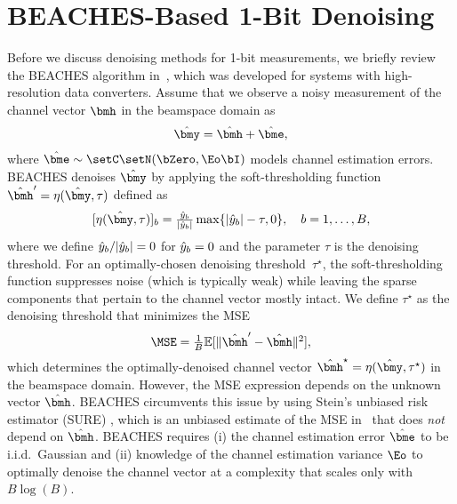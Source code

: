 
\section{BEACHES-Based 1-Bit Denoising}
\label{sec:one_bit_denoising}
Before we discuss denoising methods for 1-bit measurements, we briefly review the BEACHES algorithm in~\cite{ghods19a}, which was developed for systems with high-resolution data converters. Assume that we observe a noisy measurement of the channel vector $\bmh$ in the beamspace domain as
\begin{align} \label{eq:noisy_measurement}
\yhat = \hhat + \ehat,
\end{align}
where $\ehat\sim\setC\setN(\bZero,\Eo\bI)$ models channel estimation errors.
BEACHES denoises $\yhat$ by applying the soft-thresholding function $\hhattick = \eta(\yhat,\tau)$ defined as 
\begin{align}
\textstyle [\eta(\yhat,\tau)]_b = \frac{\yhate{b}}{|\yhate{b}|}\max\{|\yhate{b}|-\tau,0\},  \quad b=1,\ldots,B,
\end{align}  
where we define ${\hat{y}_{b}}/{|\hat{y}_{b}|} = 0$ for $\hat{y}_{b} = 0$ and the parameter $\tau$ is the denoising threshold. 
%
For an optimally-chosen denoising threshold~$\tau^\star$, the soft-thresholding function suppresses noise (which is typically weak) while leaving the sparse components that pertain to the channel vector mostly intact.  We define $\tau^\star$ as the denoising threshold that minimizes the MSE  
%
\begin{align} \label{eq:MSE}
\textstyle \MSE = \frac{1}{B}\smolE{\|\hhattick-\hhat\|^2},
\end{align}
%
which determines the optimally-denoised channel vector $\hhatstar = \eta(\yhat,\tau^\star)$ in the beamspace domain. However, the MSE expression depends on the unknown vector $\hhat$. BEACHES circumvents this issue by using Stein's unbiased risk estimator (SURE) \cite{donoho95}, which is an unbiased estimate of the MSE in~ that does \emph{not} depend on $\hhat$. 
%
BEACHES requires (i) the channel estimation error $\hat\bme$ to be i.i.d.\ Gaussian
and (ii) knowledge of the channel estimation variance $\Eo$ to optimally denoise the channel vector at a complexity that scales only with $B\log(B)$. 


%
